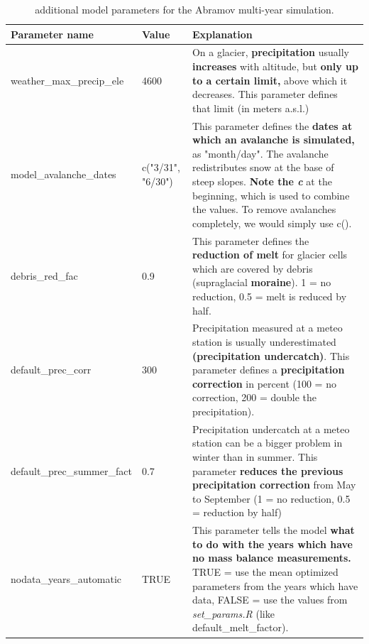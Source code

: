 \documentclass[15pt]{extarticle}
\begin{document}
\begin{table}[h!]
\caption{additional model parameters for the Abramov multi-year simulation.}
\label{table:t2_additional_parameters}
\centering
\begin{tabularx}{\textwidth}{|l l X|} 
 \hline
 \textbf{Parameter name} & \textbf{Value} & \textbf{Explanation} \\ [0.5ex] 
 \hline
 weather\_max\_precip\_ele & 4600 & On a glacier, \textbf{precipitation} usually \textbf{increases} with altitude, but \textbf{only up to a certain limit,} above which it decreases. This parameter defines that limit (in meters a.s.l.)\\
 \hline
 model\_avalanche\_dates & c("3/31", "6/30") & This parameter defines the \textbf{dates at which an avalanche is simulated,} as "month/day". The avalanche redistributes snow at the base of steep slopes. \textbf{Note the \textit{c}} at the beginning, which is used to combine the values. To remove avalanches completely, we would simply use c().\\
 \hline
 debris\_red\_fac & 0.9 & This parameter defines the \textbf{reduction of melt} for glacier cells which are covered by debris (supraglacial \textbf{moraine}). 1 = no reduction, 0.5 = melt is reduced by half.\\ 
 \hline
 default\_prec\_corr & 300 & Precipitation measured at a meteo station is usually underestimated \textbf{(precipitation undercatch)}. This parameter defines a \textbf{precipitation correction} in percent (100 = no correction, 200 = double the precipitation).\\
 \hline
 default\_prec\_summer\_fact & 0.7 & Precipitation undercatch at a meteo station can be a bigger problem in winter than in summer. This parameter \textbf{reduces the previous precipitation correction} from May to September (1 = no reduction, 0.5 = reduction by half)\\
 \hline
 nodata\_years\_automatic & TRUE & This parameter tells the model \textbf{what to do with the years which have no mass balance measurements.} TRUE = use the mean optimized parameters from the years which have data, FALSE = use the values from \textit{set\_params.R} (like default\_melt\_factor).\\
 \hline
 
\end{tabularx}
\end{table}

\clearpage
\end{document}
